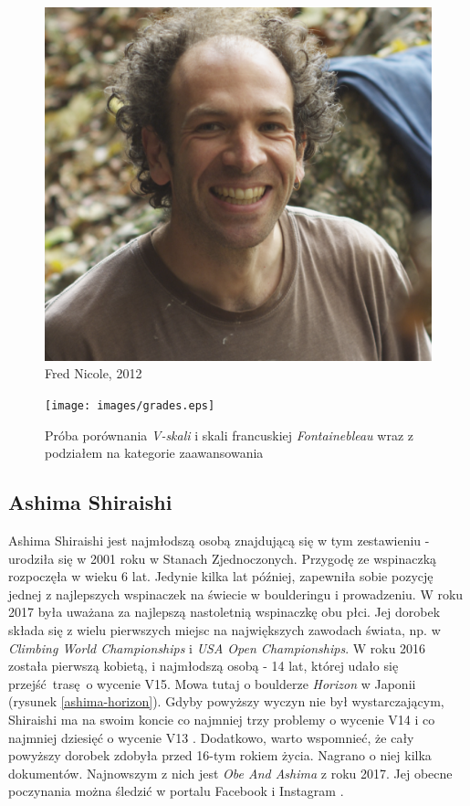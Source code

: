\documentclass{article}
\begin{document}
\begin{figure}[!htbp]
	\begin{center}
		\includegraphics[width=0.5\linewidth]{images/nicole.eps}
	\end{center}
	\caption{Fred Nicole, 2012 \cite{wiki-nicole}}
	\label{nicole}
\end{figure}

\begin{figure}[!htbp]
	\begin{center}
		\texttt{[image: images/grades.eps]}
	\end{center}
	\caption{Próba porównania \textit{V-skali} i skali francuskiej \textit{Fontainebleau} wraz z podziałem na kategorie zaawansowania \cite{grades}}
	\label{grades}
\end{figure}

\subsection{Ashima Shiraishi}
Ashima Shiraishi jest najmłodszą osobą znajdującą się w tym zestawieniu - urodziła się w 2001 roku w Stanach Zjednoczonych. Przygodę ze wspinaczką rozpoczęła w wieku 6 lat. Jedynie kilka lat później, zapewniła sobie pozycję jednej z najlepszych wspinaczek na świecie w boulderingu i prowadzeniu. W roku 2017 była uważana za najlepszą nastoletnią wspinaczkę obu płci. Jej dorobek składa się z wielu pierwszych miejsc na największych zawodach świata, np. w \textit{Climbing World Championships} i \textit{USA Open Championships}. W roku 2016 została pierwszą kobietą, i najmłodszą osobą - 14 lat, której udało się przejść trasę o wycenie V15. Mowa tutaj o boulderze \textit{Horizon} w Japonii (rysunek \ref{ashima-horizon}). Gdyby powyższy wyczyn nie był wystarczającym, Shiraishi ma na swoim koncie co najmniej trzy problemy o wycenie V14 i co najmniej dziesięć o wycenie V13 \cite{wiki-ashima}. Dodatkowo, warto wspomnieć, że cały powyższy dorobek zdobyła przed 16-tym rokiem życia. Nagrano o niej kilka dokumentów. Najnowszym z nich jest \textit{Obe And Ashima} z roku 2017. Jej obecne poczynania można śledzić w portalu Facebook \cite{ashima-fb} i Instagram \cite{ashima-ig}.
\end{document}
